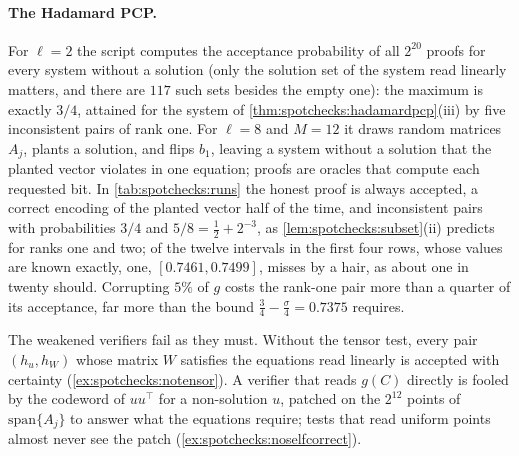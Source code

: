 \begin{refsection}
\paragraph{The Hadamard PCP.} For $\ell=2$ the script computes the acceptance probability of all $2^{20}$ proofs for every system without a solution (only the solution set of the system read linearly matters, and there are $117$ such sets besides the empty one): the maximum is exactly $3/4$, attained for the system of \cref{thm:spotchecks:hadamardpcp}(iii) by five inconsistent pairs of rank one. For $\ell=8$ and $M=12$ it draws random matrices $A_j$, plants a solution, and flips $b_1$, leaving a system without a solution that the planted vector violates in one equation; proofs are oracles that compute each requested bit. In \cref{tab:spotchecks:runs} the honest proof is always accepted, a correct encoding of the planted vector half of the time, and inconsistent pairs with probabilities $3/4$ and $5/8=\frac12+2^{-3}$, as \cref{lem:spotchecks:subset}(ii) predicts for ranks one and two; of the twelve intervals in the first four rows, whose values are known exactly, one, $[0.7461,0.7499]$, misses by a hair, as about one in twenty should. Corrupting $5\%$ of $g$ costs the rank-one pair more than a quarter of its acceptance, far more than the bound $\frac34-\frac\sigma4=0.7375$ requires.

The weakened verifiers fail as they must. Without the tensor test, every pair $(h_u,h_W)$ whose matrix $W$ satisfies the equations read linearly is accepted with certainty (\cref{ex:spotchecks:notensor}). A verifier that reads $g(C)$ directly is fooled by the codeword of $uu^\top$ for a non-solution $u$, patched on the $2^{12}$ points of $\mathrm{span}\{A_j\}$ to answer what the equations require; tests that read uniform points almost never see the patch (\cref{ex:spotchecks:noselfcorrect}).


\end{refsection}

